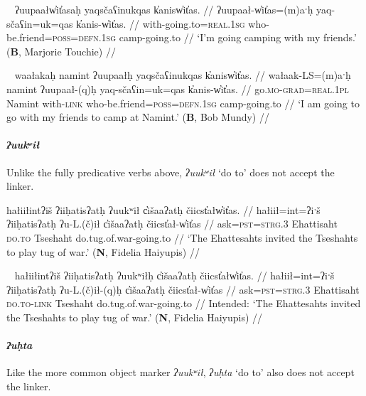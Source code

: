 \ex~ \label{ex:uupaal2}
\begingl
\glpreamble ʔuupaałw̓it̓asaḥ yaqsčaʕinukqas k̓anisw̓it̓as. //
\gla ʔuupaał-w̓it̓as=(m)aˑḥ yaq-sčaʕin=uk=qas k̓anis-w̓it̓as. //
\glb with-going.to=\textsc{real.1sg} who-be.friend=\textsc{poss}=\textsc{defn.1sg} camp-going.to //
\glft `I'm going camping with my friends.' (\textbf{B}, Marjorie Touchie) //
\endgl
\xe

\ex~ \label{ex:uupaalqh2}
\begingl
\glpreamble waałakaḥ namint ʔuupaałḥ yaqsčaʕinukqas k̓anisw̓it̓as. //
\gla wałaak-LS=(m)aˑḥ namint ʔuupaał-(q)ḥ yaq-sčaʕin=uk=qas k̓anis-w̓it̓as. //
\glb go.\textsc{mo}-\textsc{grad}=\textsc{real.1pl} Namint with-\textsc{link} who-be.friend=\textsc{poss}=\textsc{defn.1sg} camp-going.to //
\glft `I am going to go with my friends to camp at Namint.' (\textbf{B}, Bob Mundy) //
\endgl
\xe
	
\paragraph{\textit{ʔuukʷił}} \label{sec:link:uukwil} Unlike the fully predicative verbs above, \textit{ʔuukʷił} `do to' does not accept the linker.

\ex \label{ex:tugofwar1}
\begingl
\glpreamble hałiiłintʔiš ʔiiḥatisʔatḥ ʔuukʷił c̓išaaʔatḥ čiicst̓ałw̓it̓as. //
\gla hałiił=int=ʔiˑš ʔiiḥatisʔatḥ ʔu-L.(č)ił c̓išaaʔatḥ čiicst̓ał-w̓it̓as //
\glb ask=\textsc{pst}=\textsc{strg.3} Ehattisaht \textsc{do.to} Tseshaht do.tug.of.war-going.to //
\glft `The Ehattesahts invited the Tseshahts to play tug of war.' (\textbf{N}, Fidelia Haiyupis) //
\endgl
\xe

\ex~ \label{ex:tugofwar2}
\begingl
\glpreamble *hałiiłintʔiš ʔiiḥatisʔatḥ ʔuukʷiłḥ c̓išaaʔatḥ čiicst̓ałw̓it̓as. //
\gla hałiił=int=ʔiˑš ʔiiḥatisʔatḥ ʔu-L.(č)ił-(q)ḥ c̓išaaʔatḥ čiicst̓ał-w̓it̓as //
\glb ask=\textsc{pst}=\textsc{strg.3} Ehattisaht \textsc{do.to}-\textsc{link} Tseshaht do.tug.of.war-going.to //
\glft Intended: `The Ehattesahts invited the Tseshahts to play tug of war.' (\textbf{N}, Fidelia Haiyupis) //
\endgl
\xe

\paragraph{\textit{ʔuḥta}} \label{sec:link:uhta} Like the more common object marker \textit{ʔuukʷił}, \textit{ʔuḥta} `do to' also does not accept the linker.

\vspace{5pt}

